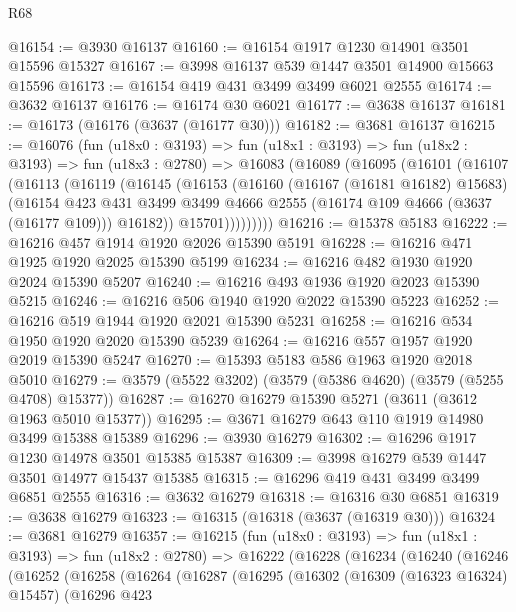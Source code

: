 \begin{lexlean}{R68}
\begin{coremodule}
@16154 := @3930 @16137
@16160 := @16154 @1917 @1230 @14901 @3501 @15596 @15327
@16167 := @3998 @16137 @539 @1447 @3501 @14900 @15663 @15596
@16173 := @16154 @419 @431 @3499 @3499 @6021 @2555
@16174 := @3632 @16137
@16176 := @16174 @30 @6021
@16177 := @3638 @16137
@16181 := @16173 (@16176 (@3637 (@16177 @30)))
@16182 := @3681 @16137
@16215 := @16076
    (fun (u18x0 : @3193) =>
    fun (u18x1 : @3193) =>
    fun (u18x2 : @3193) =>
    fun (u18x3 : @2780) =>
    @16083
      (@16089
        (@16095
          (@16101
            (@16107
              (@16113
                (@16119
                  (@16145
                    (@16153
                      (@16160
                        (@16167 (@16181 @16182) @15683)
                        (@16154
                          @423
                          @431
                          @3499
                          @3499
                          @4666
                          @2555
                          (@16174 @109 @4666 (@3637 (@16177 @109)))
                          @16182))
                      @15701)))))))))
@16216 := @15378 @5183
@16222 := @16216 @457 @1914 @1920 @2026 @15390 @5191
@16228 := @16216 @471 @1925 @1920 @2025 @15390 @5199
@16234 := @16216 @482 @1930 @1920 @2024 @15390 @5207
@16240 := @16216 @493 @1936 @1920 @2023 @15390 @5215
@16246 := @16216 @506 @1940 @1920 @2022 @15390 @5223
@16252 := @16216 @519 @1944 @1920 @2021 @15390 @5231
@16258 := @16216 @534 @1950 @1920 @2020 @15390 @5239
@16264 := @16216 @557 @1957 @1920 @2019 @15390 @5247
@16270 := @15393 @5183 @586 @1963 @1920 @2018 @5010
@16279 := @3579 (@5522 @3202) (@3579 (@5386 @4620) (@3579 (@5255 @4708) @15377))
@16287 := @16270 @16279 @15390 @5271 (@3611 (@3612 @1963 @5010 @15377))
@16295 := @3671 @16279 @643 @110 @1919 @14980 @3499 @15388 @15389
@16296 := @3930 @16279
@16302 := @16296 @1917 @1230 @14978 @3501 @15385 @15387
@16309 := @3998 @16279 @539 @1447 @3501 @14977 @15437 @15385
@16315 := @16296 @419 @431 @3499 @3499 @6851 @2555
@16316 := @3632 @16279
@16318 := @16316 @30 @6851
@16319 := @3638 @16279
@16323 := @16315 (@16318 (@3637 (@16319 @30)))
@16324 := @3681 @16279
@16357 := @16215
    (fun (u18x0 : @3193) =>
    fun (u18x1 : @3193) =>
    fun (u18x2 : @2780) =>
    @16222
      (@16228
        (@16234
          (@16240
            (@16246
              (@16252
                (@16258
                  (@16264
                    (@16287
                      (@16295
                        (@16302
                          (@16309 (@16323 @16324) @15457)
                          (@16296
                            @423

\end{coremodule}
\end{lexlean}

